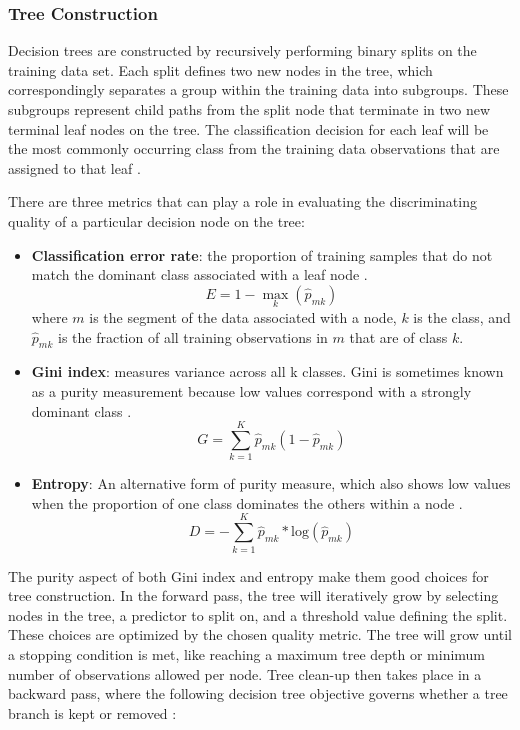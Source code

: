 \subsubsection{Tree Construction}
Decision trees are constructed by recursively performing binary splits on the training data set. Each split defines two new nodes in the tree, which correspondingly separates a group within the training data into subgroups. These subgroups represent child paths from the split node that terminate in two new terminal leaf nodes on the tree. The classification decision for each leaf will be the most commonly occurring class from the training data observations that are assigned to that leaf \citep[~p. 311]{james_introduction_2013}.

There are three metrics that can play a role in evaluating the discriminating quality of a particular decision node on the tree:

\begin{itemize}
    \item \textbf{Classification error rate}: the proportion of training samples that do not match the dominant class associated with a leaf node \citep[~p. 312]{james_introduction_2013}.
    \begin{equation} \label{eq:error_rate}
        E = 1 - \max_k(\hat{p}_{mk})
    \end{equation}
    where $m$ is the segment of the data associated with a node, $k$ is the class, and $\hat{p}_{mk}$ is the fraction of all training observations in $m$ that are of class $k$. 
    \item \textbf{Gini index}: measures variance across all k classes. Gini is sometimes known as a purity measurement because low values correspond with a strongly dominant class \citep[~p. 312]{james_introduction_2013}.
    \begin{equation}
        G = \sum_{k=1}^{K}{\hat{p}_{mk}(1-\hat{p}_{mk})}
    \end{equation}
    \item \textbf{Entropy}: An alternative form of purity measure, which also shows low values when the proportion of one class dominates the others within a node \citep[~p. 312]{james_introduction_2013}.
    \begin{equation}
        D = -\sum_{k=1}^{K}{\hat{p}_{mk}* \text{log}(\hat{p}_{mk})}
    \end{equation}
\end{itemize}

The purity aspect of both Gini index and entropy make them good choices for tree construction. In the forward pass, the tree will iteratively grow by selecting nodes in the tree, a predictor to split on, and a threshold value defining the split. These choices are optimized by the chosen quality metric. The tree will grow until a stopping condition is met, like reaching a maximum tree depth or minimum number of observations allowed per node. Tree clean-up then takes place in a backward pass, where the following decision tree objective governs whether a tree branch is kept or removed \citep[~p. 309]{james_introduction_2013}:

